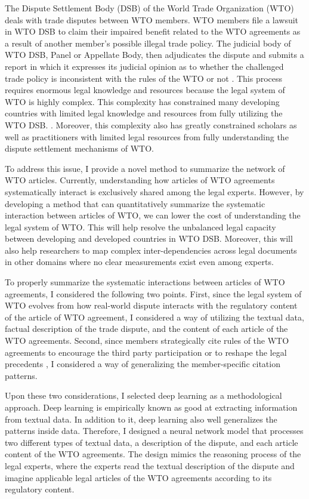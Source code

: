 The Dispute Settlement Body (DSB) of the World Trade Organization (WTO) deals with trade disputes between WTO members.
WTO members file a lawsuit in WTO DSB to claim their impaired benefit related to the WTO agreements as a result of another member's possible illegal trade policy. The judicial body of WTO DSB, Panel or Appellate Body, then adjudicates the dispute and submits a report in which it expresses its judicial opinion as to whether the challenged trade policy is inconsistent with the rules of the WTO or not \citep{world2017handbook}. This process requires enormous legal knowledge and resources because the legal system of WTO is highly complex. This complexity has constrained many developing countries with limited legal knowledge and resources from fully utilizing the WTO DSB. \citep{busch_reinhardt_shaffer_2009, dev_busch, shaffer_2006}. Moreover, this complexity also has greatly constrained scholars as well as practitioners with limited legal resources from fully understanding the dispute settlement mechanisms of WTO. 

To address this issue, I provide a novel method to summarize the network of WTO articles.
Currently, understanding how articles of WTO agreements systematically interact is exclusively shared among the legal experts.
However, by developing a method that can quantitatively summarize the systematic interaction between articles of WTO,
we can lower the cost of understanding the legal system of WTO. This will help resolve the unbalanced legal capacity between developing and developed countries in WTO DSB. Moreover, this will also help researchers to map complex inter-dependencies across legal documents in other domains where no clear measurements exist even among experts.

To properly summarize the systematic interactions between articles of WTO agreements, I considered the following two points.
First, since the legal system of WTO evolves from how real-world dispute interacts with the regulatory content of the article of WTO agreement, I considered a way of utilizing the textual data, factual description of the trade dispute, and the content of each article of the WTO agreements. Second, since members strategically cite rules of the WTO agreements to encourage the third party participation \citep{who_gets} or to reshape the legal precedents \citep{pelc, latent}, I considered a way of generalizing the member-specific citation patterns.

Upon these two considerations, I selected deep learning as a methodological approach. Deep learning is empirically known as good at extracting information from textual data. In addition to it, deep learning also well generalizes the patterns inside data. Therefore, I designed a neural network model that processes two different types of textual data, a description of the dispute, and each article content of the WTO agreements. The design mimics the reasoning process of the legal experts, where the experts read the textual description of the dispute and imagine applicable legal articles of the WTO agreements according to its regulatory content.

